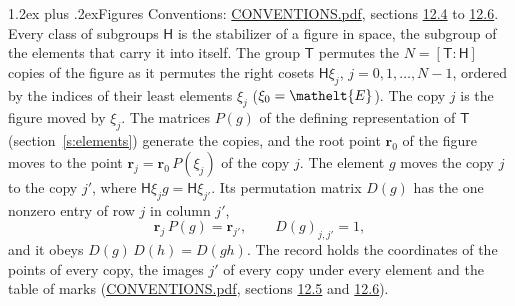 \documentclass[10pt,a4paper]{article}
\makeatletter
\renewcommand\section{\@startsection{section}{1}{\z@}{-3ex plus -1ex minus -.2ex}%
  {1.2ex plus .2ex}{\normalfont\large\sffamily\bfseries\color{parttitle}}}
\numberwithin{equation}{section}
\newcommand{\eltfont}[1]{{\let\sigma\eltsigma\mathelt{#1}}}
\newcommand{\grp}[1]{\mathsf{#1}}
\newcommand{\cls}[1]{\eltfont{#1}}
\newcommand{\pointr}{\mathbf{r}}
\makeatother
\begin{document}
\section{Figures}\label{s:permutation}
Conventions: \href{../../CONVENTIONS.pdf}{CONVENTIONS.pdf}, sections \href{../../CONVENTIONS.pdf\#conv.12.4}{12.4} to \href{../../CONVENTIONS.pdf\#conv.12.6}{12.6}.
Every class of subgroups $\grp{H}$ is the stabilizer of a figure in space, the subgroup of the elements that carry it into itself. \label{n:local.orbit.size}\label{n:element.coset.least}\label{n:index.coset}The group $\grp{T}$ permutes the $N = [\grp{T} : \grp{H}]$ copies of the figure as it permutes the right cosets $\grp{H}\xi_j$, $j = 0, 1, \dots, N - 1$, ordered by the indices of their least elements $\xi_j$ ($\xi_0 = \cls{E}$). The copy $j$ is the figure moved by $\xi_j$. The matrices $P(g)$ of the defining representation of $\grp{T}$ (section~\ref{s:elements}) generate the copies, and the root point $\pointr_0$ of the figure moves to the point $\pointr_j = \pointr_0\, P(\xi_j)$ of the copy $j$. \label{n:local.coset.image}The element $g$ moves the copy $j$ to the copy $j'$, where $\grp{H}\xi_j g = \grp{H}\xi_{j'}$. \label{n:local.matrix.permutation}Its permutation matrix $D(g)$ has the one nonzero entry of row $j$ in column $j'$,
\begin{equation}\label{e:perm.matrix}\pointr_j\, P(g) = \pointr_{j'}, \qquad D(g)_{j,j'} = 1,\end{equation}
and it obeys $D(g)\, D(h) = D(gh)$. The record holds the coordinates of the points of every copy, the images $j'$ of every copy under every element and the table of marks (\href{../../CONVENTIONS.pdf}{CONVENTIONS.pdf}, sections \href{../../CONVENTIONS.pdf\#conv.12.5}{12.5} and \href{../../CONVENTIONS.pdf\#conv.12.6}{12.6}).
\end{document}

